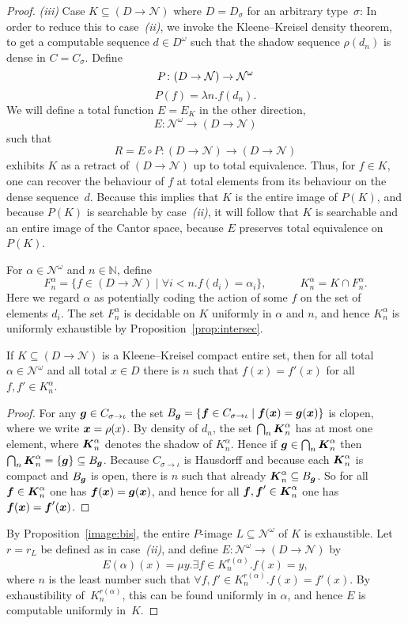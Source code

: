 \documentclass{LMCS}
\newcommand{\myomega}{\omega}
\newcommand{\N}{\mathbb{N}}
\newcommand{\pN}{\mathcal{N}}
\newcommand{\qq}{\rho}
\newcommand{\D}{D}
\newcommand{\C}{C}
\newcommand{\kk}[1]{{\C_{#1}}}
\newcommand{\comp}{\circ}
\newcommand{\g}{\operatorname{\text{\boldmath{$g$}}}}
\newcommand{\f}{\operatorname{\text{\boldmath{$f$}}}}
\newcommand{\x}{\operatorname{\text{\boldmath{$x$}}}}
\newcommand{\sK}{\operatorname{\text{\boldmath{$K$}}}}
\begin{document}
\begin{proof}
\pagebreak[3] \emph{(iii)} Case $K \subseteq (D \to \pN)$ where
$D=D_{\sigma}$ for an arbitrary type~$\sigma$: In order to reduce this
to case~\emph{(ii)}, we invoke the Kleene--Kreisel density
theorem, to get a computable sequence $d \in D^\myomega$ such that the shadow
sequence $\rho(d_n)$ is dense in $C=\kk{\sigma}$.  Define
\[
  P \colon (D \to \pN) \to \pN^\myomega \\
\]
\[
  P(f) = \lambda n.f(d_n).
\]
We will define a total function $E=E_K$ in the other direction,
\[
  E \colon \pN^\myomega \to  (D \to \pN)
\]
such that
\[
R=E \comp P\colon (\D \to \pN) \to (\D \to \pN)
\]
exhibits $K$ as a retract of $(\D \to \pN)$ up to total equivalence.
Thus, for $f \in K$, one can recover the behaviour of $f$
at total elements from its behaviour on the dense sequence~$d$.
Because this implies that $K$ is the entire image of $P(K)$, and
because $P(K)$ is searchable by case~\emph{(ii)}, it will follow that
$K$ is searchable and an entire image of the Cantor space, because $E$
preserves total equivalence on~$P(K)$.

For $\alpha \in \pN^\myomega$ and $n \in \N$, define
\[
F_n^\alpha = \{ f \in (D \to \pN) \mid \forall i<n. f(d_i) = \alpha_i \}, \qquad\quad
K_n^\alpha = K \cap F_n^\alpha.
\]
Here we regard $\alpha$ as potentially coding the action of some $f$
on the set of elements $d_i$.  The set $F_n^\alpha$ is decidable on
$K$ uniformly in $\alpha$ and $n$, and hence $K_n^\alpha$ is uniformly
exhaustible by Proposition~\ref{prop:intersec}.  \pagebreak[3]
\begin{lem} \label{c} If $K \subseteq (D \to \pN)$ is a
  Kleene--Kreisel compact entire set, then for all total $\alpha \in
  \pN^\myomega$ and all total $x \in D$ there is $n$ such that $f(x) =
  f'(x)$ for all $f,f' \in K_n^\alpha$.
\end{lem}
\begin{proof}
  For any $\g \in \kk{\sigma \to \iota}$ the set $B_{\g} = \{ \f \in
  \kk{\sigma \to \iota} \mid \f(\x) = \g(\x) \}$ is clopen, where we
  write $\x = \qq(x)$. By density of $d_n$, the set $\bigcap_n
  \sK_n^\alpha$ has at most one element, where $\sK_n^\alpha$ denotes
  the shadow of $K_n^\alpha$. Hence if $\g \in \bigcap_n \sK_n^\alpha$
  then $\bigcap_n \sK_n^\alpha = \{ \g \} \subseteq B_{\g}$.  Because
  $\kk{\sigma \to \iota}$ is Hausdorff and because each $\sK_n^\alpha$
  is compact and $B_{\g}$ is open, there is $n$ such that already
  $\sK_n^\alpha \subseteq B_{\g}$. So for all $\f \in \sK_n^\alpha$
  one has $\f(\x) = \g(\x)$, and hence for all $\f,\f' \in
  \sK_n^\alpha$ one has $\f(\x) = \f'(\x)$.
\end{proof}
By Proposition~\ref{image:bis}, the entire $P$-image $L \subseteq
\pN^\myomega$ of $K$ is exhaustible.  Let $r = r_{L}$
be defined as in case~\emph{(ii)}, and define $E \colon \pN^\myomega \to
(D \to \pN)$ by
\[
E(\alpha)(x) = 
  \mu y. \exists f \in K_n^{r(\alpha)}.f(x)=y,
\]
where
$n$ is the least number such that $\forall f,f' \in
  K_n^{r(\alpha)}.f(x)=f'(x).$
By exhaustibility of~$K_n^{r(\alpha)}$, this can be found uniformly
  in $\alpha$, and hence $E$ is computable uniformly in~$K$.


\end{proof}
\end{document}
